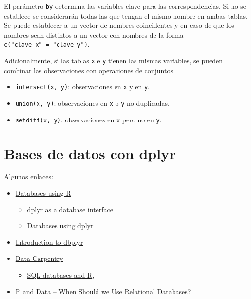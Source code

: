 \documentclass[]{book}
\providecommand{\tightlist}{%
  \setlength{\itemsep}{0pt}\setlength{\parskip}{0pt}}
\begin{document}
El parámetro \texttt{by} determina las variables clave para las
correspondencias. Si no se establece se considerarán todas las que
tengan el mismo nombre en ambas tablas. Se puede establecer a un vector
de nombres coincidentes y en caso de que los nombres sean distintos a un
vector con nombres de la forma \texttt{c("clave\_x"\ =\ "clave\_y")}.

Adicionalmente, si las tablas \texttt{x} e \texttt{y} tienen las mismas
variables, se pueden combinar las observaciones con operaciones de
conjuntos:

\begin{itemize}
\item
  \texttt{intersect(x,\ y)}: observaciones en \texttt{x} y en
  \texttt{y}.
\item
  \texttt{union(x,\ y)}: observaciones en \texttt{x} o \texttt{y} no
  duplicadas.
\item
  \texttt{setdiff(x,\ y)}: observaciones en \texttt{x} pero no en
  \texttt{y}.
\end{itemize}

\section{Bases de datos con dplyr}\label{bases-de-datos-con-dplyr}

Algunos enlaces:

\begin{itemize}
\item
  \href{https://db.rstudio.com}{Databases using R}

  \begin{itemize}
  \item
    \href{https://db.rstudio.com/overview}{dplyr as a database
    interface}
  \item
    \href{https://db.rstudio.com/dplyr}{Databases using dplyr}
  \end{itemize}
\item
  \href{https://dbplyr.tidyverse.org/articles/dbplyr.html}{Introduction
  to dbplyr}
\item
  \href{https://datacarpentry.org/R-ecology-lesson/index.html}{Data
  Carpentry}

  \begin{itemize}
  \tightlist
  \item
    \href{https://datacarpentry.org/R-ecology-lesson/05-r-and-databases.html}{SQL
    databases and R},
  \end{itemize}
\item
  \href{https://intellixus.com/2018/06/29/r-and-data-when-should-we-use-relational-databases}{R
  and Data -- When Should we Use Relational Databases?}
\end{itemize}
\end{document}

